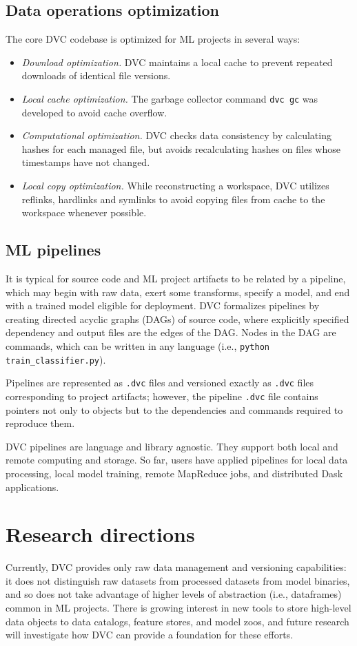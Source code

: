 \documentclass[10pt,sigconf, authordraft]{acmart}
\begin{document}
\subsection{Data operations optimization} \label{optimize}
The core DVC codebase is optimized for ML projects in several ways:
\begin{itemize}
    \item \textit{Download optimization.} DVC maintains a local cache to prevent repeated downloads of identical file versions.
    \item \textit{Local cache optimization.} The garbage collector command \verb|dvc gc| was developed to avoid cache overflow.
    \item \textit{Computational optimization.} DVC checks data consistency by calculating hashes for each managed file, but avoids recalculating hashes on files whose timestamps have not changed.
    \item \textit{Local copy optimization.} While reconstructing a workspace, DVC utilizes reflinks, hardlinks and symlinks to avoid copying files from cache to the workspace whenever possible. 
\end{itemize}


\subsection{ML pipelines} \label{pipeline}
It is typical for source code and ML project artifacts to be related by a pipeline, which may begin with raw data, exert some transforms, specify a model, and end with a trained model eligible for deployment. DVC formalizes pipelines by creating directed acyclic graphs (DAGs) of source code, where explicitly specified dependency and output files are the edges of the DAG. Nodes in the DAG are commands, which can be written in any language (i.e., \verb|python train_classifier.py|).  

Pipelines are represented as \verb|.dvc| files and versioned exactly as \verb|.dvc| files corresponding to project artifacts; however, the pipeline \verb|.dvc| file contains pointers not only to objects but to the dependencies and commands required to reproduce them. 

DVC pipelines are language and library agnostic. They support both local and remote computing and storage. So far, users have applied pipelines for local data processing, local model training, remote MapReduce jobs, and distributed Dask applications. 

\section{Research directions}
Currently, DVC provides only raw data management and versioning capabilities: it does not distinguish raw datasets from processed datasets from model binaries, and so does not take advantage of higher levels of abstraction (i.e., dataframes) common in ML projects. There is growing interest in new tools to store high-level data objects to data catalogs, feature stores, and model zoos, and future research will investigate how DVC can provide a foundation for these efforts. 
\end{document}
